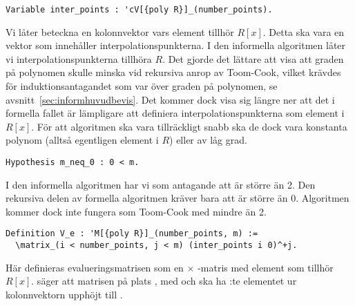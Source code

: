 
\begin{lstlisting}
Variable inter_points : 'cV[{poly R}]_(number_points).
\end{lstlisting}

Vi låter  beteckna en kolonnvektor vars element tillhör $R[x]$.
Detta ska vara en vektor som innehåller interpolationspunkterna. I den
informella algoritmen låter vi interpolationspunkterna tillhöra $R$. Det gjorde
det lättare att visa att graden på polynomen skulle minska vid rekursiva anrop
av Toom-Cook, vilket krävdes för induktionsantagandet som var över graden på
polynomen, se avsnitt~\ref{sec:informhuvudbevis}. Det kommer dock visa sig
längre ner att det i formella fallet är lämpligare att definiera
interpolationspunkterna som element i $R[x]$. För att algoritmen ska vara
tillräckligt snabb ska de dock vara konstanta polynom (alltså egentligen
element i $R$) eller av låg grad.


\begin{lstlisting}
Hypothesis m_neq_0 : 0 < m.
\end{lstlisting}

I den informella algoritmen har vi som antagande att  är större än 2. Den
rekursiva delen av formella algoritmen kräver bara att  är större än 0.
Algoritmen kommer dock inte fungera som Toom-Cook med  mindre än 2.

\begin{lstlisting}
Definition V_e : 'M[{poly R}]_(number_points, m) :=
  \matrix_(i < number_points, j < m) (inter_points i 0)^+j.
\end{lstlisting}
Här definieras evalueringsmatrisen  som en  $\times$
-matris med element som tillhör $R[x]$.
 säger att matrisen
på plats , med  och  ska ha :te
elementet ur kolonnvektorn  upphöjt till .


